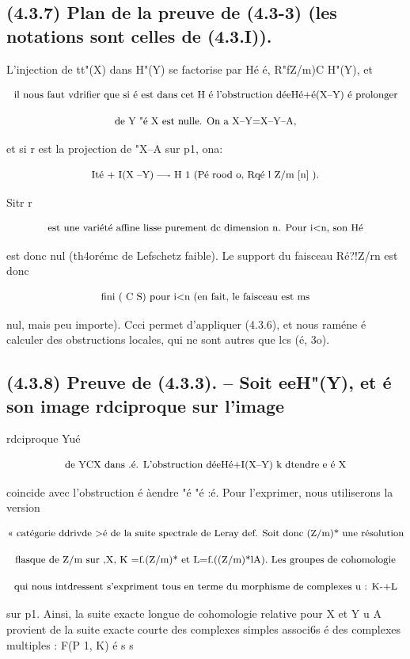 \documentclass[11pt]{article}
\theoremstyle{remark}
\begin{document}
\subsection*{(4.3.7) Plan de la preuve de (4.3-3) (les notations sont celles de (4.3.I)).}

L'injection de tt"(X) dans H"(Y) se factorise par Hé é, R"fZ/m)C H"(Y), et

\[\text{\small il nous faut vdrifier que si é est dans cet H é l'obstruction déeHé+é(X--Y) é prolonger}\]

\[\text{\small de Y "é X est nulle. On a X--Y=X--Y--A,}\]

et si r est la projection de "X--A sur p1, ona:

\[\text{\small Ité + I(X --Y) ---- H 1 (Pé rood o, Rqé l Z/m [n] ).}\]

Sitr r

\[\text{\small est une variété affine lisse purement dc dimension n. Pour i<n, son Hé}\]

est donc nul (th4orémc de Lefschetz faible). Le support du faisceau Ré?!Z/rn est donc

\[\text{\small fini ( C S) pour i<n (en fait, le faisceau est ms}\]

nul, mais peu importe). Ccci permet d'appliquer (4.3.6), et nous raméne é calculer des obstructions locales, qui ne sont autres que lcs (é, 3o).

\subsection*{(4.3.8) Preuve de (4.3.3). -- Soit eeH"(Y), et é son image rdciproque sur l'image}

rdciproque Yué

\[\text{\small de YCX dans .é. L'obstruction déeHé+I(X--Y) k dtendre e é X}\]

coincide avec l'obstruction é àendre "é "é :é. Pour l'exprimer, nous utiliserons la version

\[\text{\small << catégorie ddrivde >é de la suite spectrale de Leray def. Soit donc (Z/m)* une résolution}\]

\[\text{\small flasque de Z/m sur ,X, K =f.(Z/m)* et L=f.((Z/m)*lA). Les groupes de cohomologie}\]

\[\text{\small qui nous intdressent s'expriment tous en terme du morphisme de complexes u : K-+L}\]

sur p1. Ainsi, la suite exacte longue de cohomologie relative pour X et Y u A provient de la suite exacte courte des complexes simples associ6s é des complexes multiples : F(P 1, K) é s s
\end{document}
